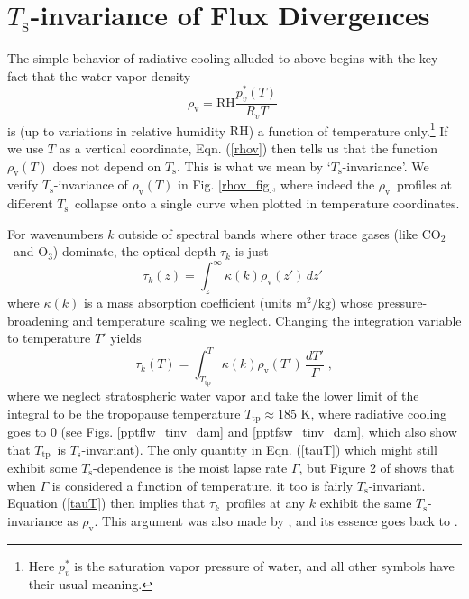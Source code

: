 \documentclass[10pt]{article}
\newcommand{\beqn}{\begin{equation}}
\newcommand{\eeqn}{\end{equation}}
\newcommand{\eqnref}[1]{(\ref{#1})}
\newcommand{\cotwo}{\ensuremath{\mathrm{CO_2}}}
\newcommand{\othree}{\ensuremath{\mathrm{O_3}}}
\newcommand{\tauk}{\ensuremath{\tau_k}}
\newcommand{\rhov}{\ensuremath{\rho_\mathrm{v}}}
\newcommand{\Ts}{\ensuremath{T_\mathrm{s}}}
\newcommand{\RH}{\ensuremath{\mathrm{RH}}}
\newcommand{\Ttp}{\ensuremath{T_\mathrm{tp}}}
\begin{document}
\section{\Ts-invariance of Flux Divergences}
The simple behavior of radiative cooling alluded to above begins with the key fact that  the water vapor density 
	\beqn
		\rhov =  \RH\frac{p_v^*(T)}{R_ vT} \; 
	\label{rhov}
	\eeqn
	 is (up to variations in relative humidity \RH) a function of temperature only.\footnote{Here $p_v^*$  is the saturation vapor pressure of water, and all other symbols have their usual meaning.} If we use $T$ as a vertical coordinate,  Eqn. \eqnref{rhov} then tells us that the function $\rhov(T)$ does not depend on \Ts. This is what we mean by `\Ts-invariance'. We verify \Ts-invariance of $\rhov(T)$  in Fig. \ref{rhov_fig}, where indeed  the \rhov\ profiles at different \Ts\ collapse onto a single curve when plotted in temperature coordinates.
	 
	For wavenumbers $k$ outside of spectral bands where other trace gases (like \cotwo\ and \othree) dominate, the optical depth $\tauk$ is just
	\beqn
		\tau_k(z) = \int_z^\infty \kappa(k)  \rhov(z') \, dz'  \; 
		\label{tauz}
	\eeqn
		where $\kappa(k)$ is a  mass absorption coefficient  (units $\mathrm{m^2/kg}$) whose pressure-broadening and temperature scaling we neglect. Changing the integration variable to temperature $T'$ yields
		\beqn
		\tau_k(T) = \int_{\Ttp}^T \kappa(k)  \rhov(T') \, \frac{dT'}{\Gamma}  \; ,
		\label{tauT}
	\eeqn
	where we neglect stratospheric water vapor and take the lower limit of the integral to be the tropopause temperature $\Ttp \approx 185$ K, where radiative cooling goes to 0 (see Figs. \ref{pptflw_tinv_dam} and  \ref{pptfsw_tinv_dam}, which also show that \Ttp\ is \Ts-invariant). The only quantity in Eqn. \eqnref{tauT} which might still exhibit some \Ts-dependence is the  moist lapse rate $\Gamma$, but Figure 2 of \cite{ingram2010} shows that when $\Gamma$ is considered a function of temperature, it too is fairly  \Ts-invariant. Equation \eqnref{tauT} then implies that \tauk\ profiles at any $k$ exhibit the same \Ts-invariance as \rhov. This argument was also made by \cite{ingram2010}, and its essence goes back to  \cite{simpson1928}.
	
\end{document}
